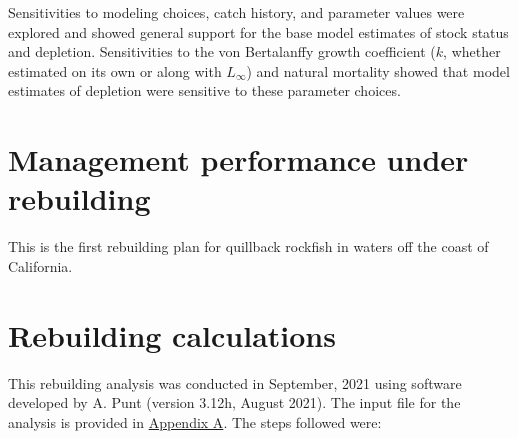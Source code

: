 \documentclass[11pt,
  english,
  a4paper,
]{article}
\begin{document}
Sensitivities to modeling choices, catch history, and parameter values were explored and showed general support for the base model estimates of stock status and depletion. Sensitivities to the von Bertalanffy growth coefficient ({\(k\)\leavevmode\tagmcend\tagstructend}, whether estimated on its own or along with {\(L_\infty\)\leavevmode\tagmcend\tagstructend}) and natural mortality showed that model estimates of depletion were sensitive to these parameter choices.

\leavevmode\tagmcend\tagstructend\par


\hypertarget{management-performance-under-rebuilding}{%
\section{Management performance under rebuilding}\label{management-performance-under-rebuilding}}

\leavevmode\tagmcend\tagstructend


This is the first rebuilding plan for quillback rockfish in waters off the coast of California.

\leavevmode\tagmcend\tagstructend\par


\hypertarget{rebuilding-calculations}{%
\section{Rebuilding calculations}\label{rebuilding-calculations}}

\leavevmode\tagmcend\tagstructend


This rebuilding analysis was conducted in September, 2021 using software developed by A. Punt (version 3.12h, August 2021). The input file for the analysis is provided in {\protect\hyperlink{append_a}{Appendix A}\leavevmode\tagmcend\tagstructend}. The steps followed were:

\leavevmode\tagmcend\tagstructend\par
\end{document}

